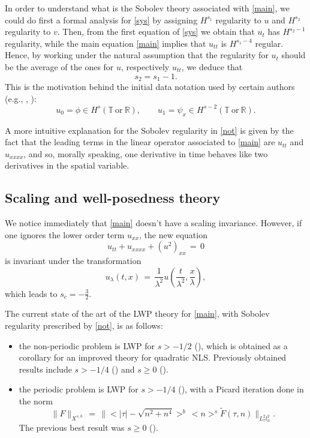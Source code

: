 \documentclass{amsart}
\begin{document}
In order to understand what is the Sobolev theory associated with \eqref{main}, we could do first a formal analysis for \eqref{sys} by assigning $H^{s_1}$ regularity to $u$ and $H^{s_2}$ regularity to $v$. Then, from the first equation of \eqref{sys} we obtain that $u_t$ has $H^{s_2-1}$ regularity, while the main equation \eqref{main} implies that $u_{tt}$ is $H^{s_1-4}$ regular. Hence, by working under the natural assumption that the regularity for $u_t$ should be the average of the ones for $u$, respectively $u_{tt}$, we deduce that
\[
s_2=s_1-1.
\] 
This is the motivation behind the initial data notation used by certain authors (e.g., \cite{F09}, \cite{FS10}):
\begin{equation}
u_0=\phi\in H^s(\mathbb{T}\ \text{or} \ \mathbb{R}), \qquad u_1=\psi_x \in H^{s-2}(\mathbb{T}\ \text{or} \ \mathbb{R}).
\label{not}
\end{equation}

A more intuitive explanation for the Sobolev regularity in \eqref{not} is given by the fact that the leading terms in the linear operator associated to \eqref{main} are $u_{tt}$ and $u_{xxxx}$, and so, morally speaking, one derivative in time behaves like two derivatives in the spatial variable. 

\subsection{Scaling and well-posedness theory} We notice immediately that \eqref{main} doesn't have a scaling invariance. However, if one ignores the lower order term $u_{xx}$, the new equation 
\begin{equation}
u_{tt}+u_{xxxx}+(u^2)_{xx}\,=\,0\label{new}
\end{equation}
is invariant under the transformation
\[
u_{\lambda}(t,x)\,=\,\frac{1}{\lambda^2}u\left(\frac{t}{\lambda^2}, \frac{x}{\lambda}\right),
\]
which leads to $s_c=-\frac 32$.

The current state of the art of the LWP theory for \eqref{main}, with Sobolev regularity prescribed by \eqref{not}, is as follows:
\begin{itemize}
\item the non-periodic problem is LWP for $s>-1/2$ (\cite{KT10}), which is obtained as a corollary for an improved theory for quadratic NLS. Previously obtained results include $s>-1/4$ (\cite{F09}) and $s\geq 0$ (\cite{L93}).

\item the periodic problem is LWP for $s>-1/4$ (\cite{FS10}), with a Picard iteration done in
the norm
\[
\|F\|_{X^{s,b}}\,=\,\|<|\tau|-\sqrt{n^2+n^4}>^b\,<n>^s \tilde{F}(\tau,n)\|_{L^2_{\tau}l^2_n}.
\]
The previous best result was $s\geq 0$ (\cite{FG96}).
\end{itemize}
\end{document}

